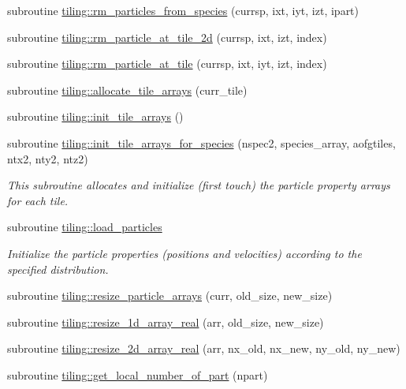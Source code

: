 \begin{DoxyCompactItemize}
\item 
subroutine \hyperlink{namespacetiling_a473875b1f5e9bc6b47ff5d088db15e58}{tiling\+::rm\+\_\+particles\+\_\+from\+\_\+species} (currsp, ixt, iyt, izt, ipart)
\item 
subroutine \hyperlink{namespacetiling_ad6083dac6e2eaccb762ecb829c954898}{tiling\+::rm\+\_\+particle\+\_\+at\+\_\+tile\+\_\+2d} (currsp, ixt, izt, index)
\item 
subroutine \hyperlink{namespacetiling_a7657907098a724d053d587ca73725958}{tiling\+::rm\+\_\+particle\+\_\+at\+\_\+tile} (currsp, ixt, iyt, izt, index)
\item 
subroutine \hyperlink{namespacetiling_aacbab18e61ac532ba396b41bab67a265}{tiling\+::allocate\+\_\+tile\+\_\+arrays} (curr\+\_\+tile)
\item 
subroutine \hyperlink{namespacetiling_a97b828159c1e05df8082c27f3aa61e13}{tiling\+::init\+\_\+tile\+\_\+arrays} ()
\item 
subroutine \hyperlink{namespacetiling_afe5a0a0a27fa1c078f8e69228d0d4a56}{tiling\+::init\+\_\+tile\+\_\+arrays\+\_\+for\+\_\+species} (nspec2, species\+\_\+array, aofgtiles, ntx2, nty2, ntz2)
\begin{DoxyCompactList}\small\item\em This subroutine allocates and initialize (first touch) the particle property arrays for each tile. \end{DoxyCompactList}\item 
subroutine \hyperlink{namespacetiling_ae5c4e98ae7e7957054dda03ab0e298f8}{tiling\+::load\+\_\+particles}
\begin{DoxyCompactList}\small\item\em Initialize the particle properties (positions and velocities) according to the specified distribution. \end{DoxyCompactList}\item 
subroutine \hyperlink{namespacetiling_aaa407b13d58fff3e54b191fa9a8962c0}{tiling\+::resize\+\_\+particle\+\_\+arrays} (curr, old\+\_\+size, new\+\_\+size)
\item 
subroutine \hyperlink{namespacetiling_ad65e35a84d2268ef2b6b4f97f38b18bc}{tiling\+::resize\+\_\+1d\+\_\+array\+\_\+real} (arr, old\+\_\+size, new\+\_\+size)
\item 
subroutine \hyperlink{namespacetiling_afa3d754a121460dce786357819629421}{tiling\+::resize\+\_\+2d\+\_\+array\+\_\+real} (arr, nx\+\_\+old, nx\+\_\+new, ny\+\_\+old, ny\+\_\+new)
\item 
subroutine \hyperlink{namespacetiling_af9f6fdf5c755688f10dc74ed3c363d85}{tiling\+::get\+\_\+local\+\_\+number\+\_\+of\+\_\+part} (npart)

\end{DoxyCompactItemize}
